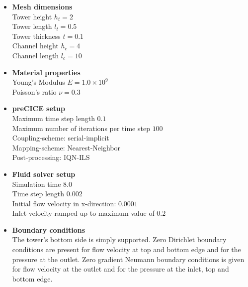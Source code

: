   \begin{itemize}
  	\item \textbf{Mesh dimensions}\\
  	Tower height $h_t = 2$\\
  	Tower length $l_t = 0.5$\\
  	Tower thickness $t = 0.1$\\
  	Channel height $h_c = 4$\\
  	Channel length $l_c = 10$  	
  	
  	\item \textbf{Material properties}\\
  	Young's Modulus $E = 1.0 \times 10^9$\\
  	Poisson's ratio $\nu = 0.3$
  	
  	\item \textbf{preCICE setup}\\
    Maximum time step length $0.1$\\
    Maximum number of iterations per time step $100$\\
    Coupling-scheme: serial-implicit\\
    Mapping-scheme: Nearest-Neighbor\\
    Post-processing: IQN-ILS
  	
  	\item \textbf{Fluid solver setup}\\
    Simulation time $8.0$\\
    Time step length $0.002$\\
  	Initial flow velocity in x-direction: $0.0001$\\
  	Inlet velocity ramped up to maximum value of $0.2$
  	
  	\item \textbf{Boundary conditions}\\
  	The tower's bottom side is simply supported. Zero Dirichlet boundary conditions are present for flow velocity at top and bottom edge and for the pressure at the outlet. Zero gradient Neumann boundary conditions is given for flow velocity at the outlet and for the pressure at the inlet, top and bottom edge.
  \end{itemize}
  
